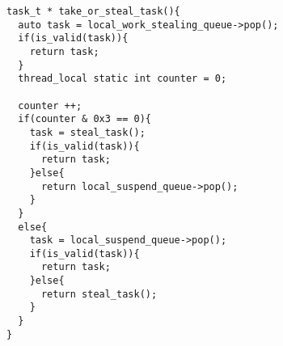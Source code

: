\begin{lstlisting}[mathescape]
task_t * take_or_steal_task(){
  auto task = local_work_stealing_queue->pop();
  if(is_valid(task)){
    return task;
  }
  thread_local static int counter = 0;

  counter ++;
  if(counter & 0x3 == 0){
    task = steal_task();
    if(is_valid(task)){
      return task;
    }else{
      return local_suspend_queue->pop();
    }
  }
  else{
    task = local_suspend_queue->pop();
    if(is_valid(task)){
      return task;
    }else{
      return steal_task();
    }
  }
}
\end{lstlisting}
